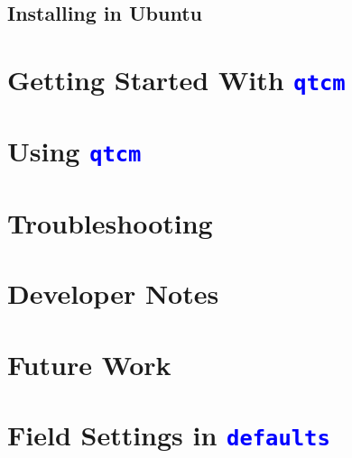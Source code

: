 \documentclass[12pt]{book}
\newcommand{\code}[1]{\textcolor{blue}{\texttt{#1}}}
\newcommand{\mods}[1]{\textcolor{blue}{\texttt{#1}}}
\begin{document}
	\section{Installing in Ubuntu}         \label{sec:install.ubuntu}
	

\chapter{Getting Started With \mods{qtcm}}  \label{ch:getting.started}


\chapter{Using \mods{qtcm}}                 \label{ch:using}



\chapter{Troubleshooting}                   \label{ch:trouble}


\chapter{Developer Notes}                   \label{ch:devnotes}


\chapter{Future Work}                       \label{ch:future}





%
\normalsize
\pagebreak



%        

\appendix
\chapter{Field Settings in \mods{defaults}}  \label{app:defaults.values}





%
\end{document}

